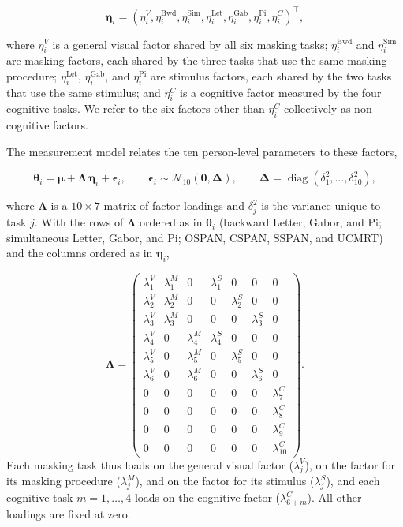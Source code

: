 \documentclass[
  ,man]{apa6}
\begin{document}
\[
\boldsymbol{\eta}_i = \left(\eta_i^{V}, \eta_i^{\text{Bwd}}, \eta_i^{\text{Sim}}, \eta_i^{\text{Let}}, \eta_i^{\text{Gab}}, \eta_i^{\text{Pi}}, \eta_i^{C}\right)^\top,
\]

where \(\eta_i^{V}\) is a general visual factor shared by all six masking tasks; \(\eta_i^{\text{Bwd}}\) and \(\eta_i^{\text{Sim}}\) are masking factors, each shared by the three tasks that use the same masking procedure; \(\eta_i^{\text{Let}}\), \(\eta_i^{\text{Gab}}\), and \(\eta_i^{\text{Pi}}\) are stimulus factors, each shared by the two tasks that use the same stimulus; and \(\eta_i^{C}\) is a cognitive factor measured by the four cognitive tasks. We refer to the six factors other than \(\eta_i^{C}\) collectively as non-cognitive factors.

The measurement model relates the ten person-level parameters to these factors,

\[
\boldsymbol{\theta}_i = \boldsymbol{\mu} + \boldsymbol{\Lambda}\,\boldsymbol{\eta}_i + \boldsymbol{\epsilon}_i, \qquad
\boldsymbol{\epsilon}_i \sim \mathcal{N}_{10}\!\left(\mathbf{0}, \boldsymbol{\Delta}\right), \qquad
\boldsymbol{\Delta} = \operatorname{diag}\!\left(\delta_1^2, \ldots, \delta_{10}^2\right),
\]

where \(\boldsymbol{\Lambda}\) is a \(10 \times 7\) matrix of factor loadings and \(\delta_j^2\) is the variance unique to task \(j\). With the rows of \(\boldsymbol{\Lambda}\) ordered as in \(\boldsymbol{\theta}_i\) (backward Letter, Gabor, and Pi; simultaneous Letter, Gabor, and Pi; OSPAN, CSPAN, SSPAN, and UCMRT) and the columns ordered as in \(\boldsymbol{\eta}_i\),

\[
\boldsymbol{\Lambda} =
\begin{pmatrix}
\lambda_1^{V} & \lambda_1^{M} & 0 & \lambda_1^{S} & 0 & 0 & 0\\
\lambda_2^{V} & \lambda_2^{M} & 0 & 0 & \lambda_2^{S} & 0 & 0\\
\lambda_3^{V} & \lambda_3^{M} & 0 & 0 & 0 & \lambda_3^{S} & 0\\
\lambda_4^{V} & 0 & \lambda_4^{M} & \lambda_4^{S} & 0 & 0 & 0\\
\lambda_5^{V} & 0 & \lambda_5^{M} & 0 & \lambda_5^{S} & 0 & 0\\
\lambda_6^{V} & 0 & \lambda_6^{M} & 0 & 0 & \lambda_6^{S} & 0\\
0 & 0 & 0 & 0 & 0 & 0 & \lambda_7^{C}\\
0 & 0 & 0 & 0 & 0 & 0 & \lambda_8^{C}\\
0 & 0 & 0 & 0 & 0 & 0 & \lambda_9^{C}\\
0 & 0 & 0 & 0 & 0 & 0 & \lambda_{10}^{C}
\end{pmatrix}.
\]
Each masking task thus loads on the general visual factor (\(\lambda_j^{V}\)), on the factor for its masking procedure (\(\lambda_j^{M}\)), and on the factor for its stimulus (\(\lambda_j^{S}\)), and each cognitive task \(m = 1, \ldots, 4\) loads on the cognitive factor (\(\lambda_{6+m}^{C}\)). All other loadings are fixed at zero.
\end{document}
